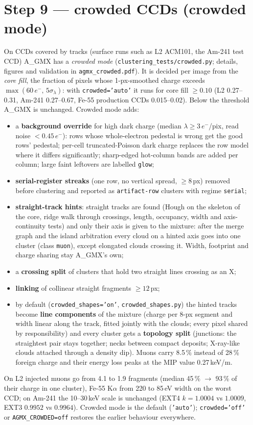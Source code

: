 \documentclass[11pt,a4paper]{article}
\newcommand{\el}{\ensuremath{e^-}}
\newcommand{\AGMX}{A\_GMX}
\newcommand{\code}[1]{\texttt{#1}}
\begin{document}
\section{Step 9 --- crowded CCDs (crowded mode)}\label{sec:crowded}
On CCDs covered by tracks (surface runs such as L2 ACM101, the Am-241 test CCD) \AGMX{} has a \emph{crowded mode}
(\code{clustering\_tests/crowded.py}; details, figures and validation in \code{agmx\_crowded.pdf}). It is decided per image
from the \emph{core fill}, the fraction of pixels whose 1-px-smoothed charge exceeds $\max(60\,\el,\,5\sigma_\lambda)$: with
\code{crowded='auto'} it runs for core fill $\ge0.10$ (L2 0.27--0.31, Am-241 0.27--0.67, Fe-55 production CCDs
0.015--0.02). Below the threshold \AGMX{} is unchanged. Crowded mode adds:
\begin{itemize}
\item a \textbf{background override} for high dark charge (median $\lambda\ge3$\,\el/pix, read noise $<0.45$\,\el): rows whose
whole-electron pedestal is wrong get the good rows' pedestal; per-cell truncated-Poisson dark charge replaces the row model
where it differs significantly; sharp-edged hot-column bands are added per column; large faint leftovers are
labelled \code{glow};
\item \textbf{serial-register streaks} (one row, no vertical spread, $\ge8$\,px) removed before clustering and reported as
\code{artifact-row} clusters with regime \code{serial};
\item \textbf{straight-track hints}: straight tracks are found (Hough on the skeleton of the core, ridge walk through crossings,
length, occupancy, width and axis-continuity tests) and only their axis is given to the mixture: after the merge graph and the
island arbitration every cloud on a hinted axis goes into one cluster (class \code{muon}), except elongated clouds crossing it.
Width, footprint and charge sharing stay \AGMX's own;
\item a \textbf{crossing split} of clusters that hold two straight lines crossing as an X;
\item \textbf{linking} of collinear straight fragments $\ge12$\,px;
\item by default (\code{crowded\_shapes='on'}, \code{crowded\_shapes.py}) the hinted tracks become \textbf{line components} of the
mixture (charge per 8-px segment and width linear along the track, fitted jointly with the clouds; every pixel shared by
responsibility) and every cluster gets a \textbf{topology split} (junctions: the straightest pair stays together; necks between
compact deposits; X-ray-like clouds attached through a density dip). Muons carry 8.5\,\% instead of 28\,\% foreign charge and
their energy loss peaks at the MIP value 0.27\,keV/\textmu m.
\end{itemize}
On L2 injected muons go from 4.1 to 1.9 fragments (median 45\,\% $\to$ 93\,\% of their charge in one cluster), Fe-55 K$\alpha$
from 220 to 85\,eV width on the worst CCD; on Am-241 the 10--30\,keV scale is unchanged (EXT4 $k=1.0004$ vs $1.0009$, EXT3
$0.9952$ vs $0.9964$). Crowded mode is the default (\code{'auto'}); \code{crowded='off'} or \code{AGMX\_CROWDED=off}
restores the earlier behaviour everywhere.
\end{document}
